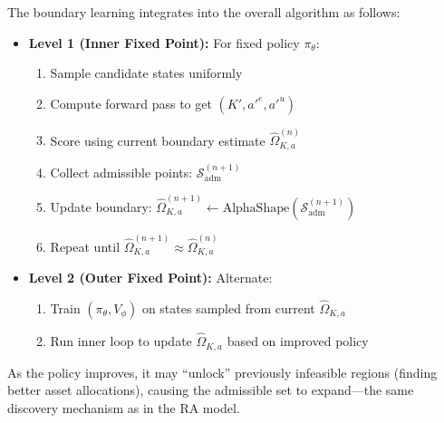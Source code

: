 The boundary learning integrates into the overall algorithm as follows:

\begin{itemize}
    \item \textbf{Level 1 (Inner Fixed Point):} For fixed policy $\pi_\theta$:
    \begin{enumerate}
        \item Sample candidate states uniformly
        \item Compute forward pass to get $(K', a'^e, a'^u)$
        \item Score using current boundary estimate $\hat{\Omega}^{(n)}_{K,a}$
        \item Collect admissible points: $\mathcal{S}_{\text{adm}}^{(n+1)}$
        \item Update boundary: $\hat{\Omega}^{(n+1)}_{K,a} \gets \text{AlphaShape}(\mathcal{S}_{\text{adm}}^{(n+1)})$
        \item Repeat until $\hat{\Omega}^{(n+1)}_{K,a} \approx \hat{\Omega}^{(n)}_{K,a}$
    \end{enumerate}
    
    \item \textbf{Level 2 (Outer Fixed Point):} Alternate:
    \begin{enumerate}
        \item Train $(\pi_\theta, V_\phi)$ on states sampled from current $\hat{\Omega}_{K,a}$
        \item Run inner loop to update $\hat{\Omega}_{K,a}$ based on improved policy
    \end{enumerate}
\end{itemize}

As the policy improves, it may ``unlock'' previously infeasible regions (finding better asset allocations), causing the admissible set to expand—the same discovery mechanism as in the RA model.

